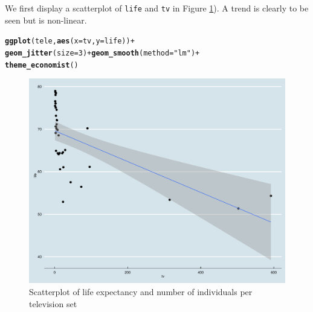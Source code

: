 \documentclass[12pt]{article}\usepackage[]{graphicx}\usepackage[]{color}
\makeatletter
\newcommand{\hlnum}[1]{\textcolor[rgb]{0.686,0.059,0.569}{#1}}%
\newcommand{\hlstr}[1]{\textcolor[rgb]{0.192,0.494,0.8}{#1}}%
\newcommand{\hlopt}[1]{\textcolor[rgb]{0,0,0}{#1}}%
\newcommand{\hlstd}[1]{\textcolor[rgb]{0.345,0.345,0.345}{#1}}%
\newcommand{\hlkwc}[1]{\textcolor[rgb]{0.333,0.667,0.333}{#1}}%
\newcommand{\hlkwd}[1]{\textcolor[rgb]{0.737,0.353,0.396}{\textbf{#1}}}%
\newenvironment{kframe}{%
 \def\at@end@of@kframe{}%
 \ifinner\ifhmode%
  \def\at@end@of@kframe{\end{minipage}}%
  \begin{minipage}{\columnwidth}%
 \fi\fi%
 \def\FrameCommand##1{\hskip\@totalleftmargin \hskip-\fboxsep
 \colorbox{shadecolor}{##1}\hskip-\fboxsep
     \hskip-\linewidth \hskip-\@totalleftmargin \hskip\columnwidth}%
 \MakeFramed {\advance\hsize-\width
   \@totalleftmargin\z@ \linewidth\hsize
   \@setminipage}}%
 {\par\unskip\endMakeFramed%
 \at@end@of@kframe}
\newenvironment{knitrout}{}{} %
\makeatother
\begin{document}
We first display a scatterplot of {\tt life} and {\tt tv} in Figure
\ref{fig:trend_simple}). A trend is clearly to be seen but is
non-linear. 
\begin{knitrout}\scriptsize
{}\color{fgcolor}\begin{kframe}
\begin{alltt}
\hlkwd{ggplot}\hlstd{(tele,} \hlkwd{aes}\hlstd{(}\hlkwc{x} \hlstd{= tv,} \hlkwc{y} \hlstd{= life))} \hlopt{+}
  \hlkwd{geom_jitter}\hlstd{(}\hlkwc{size} \hlstd{=} \hlnum{3}\hlstd{)} \hlopt{+} \hlkwd{geom_smooth}\hlstd{(}\hlkwc{method} \hlstd{=} \hlstr{"lm"}\hlstd{)} \hlopt{+}
  \hlkwd{theme_economist}\hlstd{()}
\end{alltt}


{\ttfamily\noindent\color{warningcolor}{\#\# Warning: Removed 2 rows containing missing values (stat\_smooth).}}

{\ttfamily\noindent\color{warningcolor}{\#\# Warning: Removed 2 rows containing missing values (geom\_point).}}\end{kframe}\begin{figure}[h]

{\centering \includegraphics[width=.7\textwidth]{graphics/trend_simple-1} 

}

\caption[Scatterplot of life expectancy and number of individuals per television set]{Scatterplot of life expectancy and number of individuals per television set}\label{fig:trend_simple}
\end{figure}


\end{knitrout}
\end{document}
